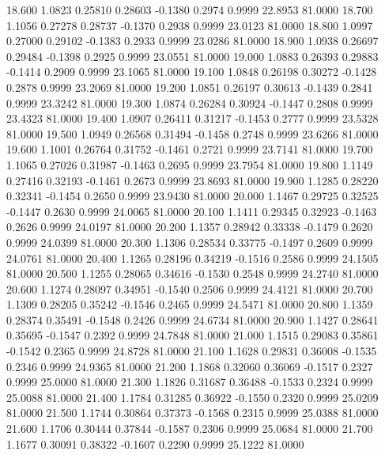   18.600   1.0823   0.25810   0.28603  -0.1380   0.2974   0.9999  22.8953  81.0000
  18.700   1.1056   0.27278   0.28737  -0.1370   0.2938   0.9999  23.0123  81.0000
  18.800   1.0997   0.27000   0.29102  -0.1383   0.2933   0.9999  23.0286  81.0000
  18.900   1.0938   0.26697   0.29484  -0.1398   0.2925   0.9999  23.0551  81.0000
  19.000   1.0883   0.26393   0.29883  -0.1414   0.2909   0.9999  23.1065  81.0000
  19.100   1.0848   0.26198   0.30272  -0.1428   0.2878   0.9999  23.2069  81.0000
  19.200   1.0851   0.26197   0.30613  -0.1439   0.2841   0.9999  23.3242  81.0000
  19.300   1.0874   0.26284   0.30924  -0.1447   0.2808   0.9999  23.4323  81.0000
  19.400   1.0907   0.26411   0.31217  -0.1453   0.2777   0.9999  23.5328  81.0000
  19.500   1.0949   0.26568   0.31494  -0.1458   0.2748   0.9999  23.6266  81.0000
  19.600   1.1001   0.26764   0.31752  -0.1461   0.2721   0.9999  23.7141  81.0000
  19.700   1.1065   0.27026   0.31987  -0.1463   0.2695   0.9999  23.7954  81.0000
  19.800   1.1149   0.27416   0.32193  -0.1461   0.2673   0.9999  23.8693  81.0000
  19.900   1.1285   0.28220   0.32341  -0.1454   0.2650   0.9999  23.9430  81.0000
  20.000   1.1467   0.29725   0.32525  -0.1447   0.2630   0.9999  24.0065  81.0000
  20.100   1.1411   0.29345   0.32923  -0.1463   0.2626   0.9999  24.0197  81.0000
  20.200   1.1357   0.28942   0.33338  -0.1479   0.2620   0.9999  24.0399  81.0000
  20.300   1.1306   0.28534   0.33775  -0.1497   0.2609   0.9999  24.0761  81.0000
  20.400   1.1265   0.28196   0.34219  -0.1516   0.2586   0.9999  24.1505  81.0000
  20.500   1.1255   0.28065   0.34616  -0.1530   0.2548   0.9999  24.2740  81.0000
  20.600   1.1274   0.28097   0.34951  -0.1540   0.2506   0.9999  24.4121  81.0000
  20.700   1.1309   0.28205   0.35242  -0.1546   0.2465   0.9999  24.5471  81.0000
  20.800   1.1359   0.28374   0.35491  -0.1548   0.2426   0.9999  24.6734  81.0000
  20.900   1.1427   0.28641   0.35695  -0.1547   0.2392   0.9999  24.7848  81.0000
  21.000   1.1515   0.29083   0.35861  -0.1542   0.2365   0.9999  24.8728  81.0000
  21.100   1.1628   0.29831   0.36008  -0.1535   0.2346   0.9999  24.9365  81.0000
  21.200   1.1868   0.32060   0.36069  -0.1517   0.2327   0.9999  25.0000  81.0000
  21.300   1.1826   0.31687   0.36488  -0.1533   0.2324   0.9999  25.0088  81.0000
  21.400   1.1784   0.31285   0.36922  -0.1550   0.2320   0.9999  25.0209  81.0000
  21.500   1.1744   0.30864   0.37373  -0.1568   0.2315   0.9999  25.0388  81.0000
  21.600   1.1706   0.30444   0.37844  -0.1587   0.2306   0.9999  25.0684  81.0000
  21.700   1.1677   0.30091   0.38322  -0.1607   0.2290   0.9999  25.1222  81.0000
